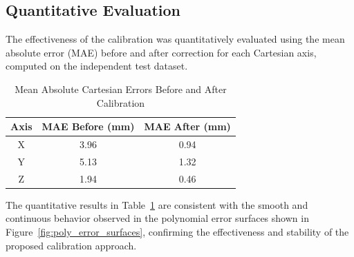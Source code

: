 
\subsection{Quantitative Evaluation}


The effectiveness of the calibration was quantitatively evaluated using the mean absolute error (MAE) before and after correction for each Cartesian axis, computed on the independent test dataset.

\begin{table}[H]
\centering
\caption{Mean Absolute Cartesian Errors Before and After Calibration}
\label{tab:mae_results}
\renewcommand{\arraystretch}{1.2}
\begin{tabular}{|c|c|c|}
\hline
\textbf{Axis} & \textbf{MAE Before (mm)} & \textbf{MAE After (mm)} \\ \hline
X & 3.96 & 0.94 \\ \hline
Y & 5.13 & 1.32 \\ \hline
Z & 1.94 & 0.46 \\ \hline
\end{tabular}
\end{table}

The quantitative results in Table~\ref{tab:mae_results} are consistent with the smooth and continuous behavior observed in the polynomial error surfaces shown in Figure~\ref{fig:poly_error_surfaces}, confirming the effectiveness and stability of the proposed calibration approach.

